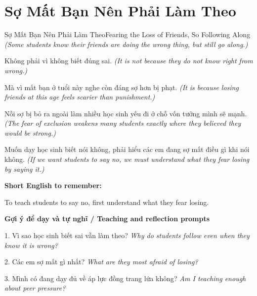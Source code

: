 \section{Sợ Mất Bạn Nên Phải Làm Theo}
\begin{truyen}{Sợ Mất Bạn Nên Phải Làm Theo}{Fearing the Loss of Friends, So Following Along}
\textit{(Some students know their friends are doing the wrong thing, but still go along.)}

Không phải vì không biết đúng sai.
\textit{(It is not because they do not know right from wrong.)}

Mà vì mất bạn ở tuổi này nghe còn đáng sợ hơn bị phạt.
\textit{(It is because losing friends at this age feels scarier than punishment.)}

Nỗi sợ bị bỏ ra ngoài làm nhiều học sinh yếu đi ở chỗ vốn tưởng mình sẽ mạnh.
\textit{(The fear of exclusion weakens many students exactly where they believed they would be strong.)}

\end{truyen}

\begin{baihoc}
Muốn dạy học sinh biết nói không, phải hiểu các em đang sợ mất điều gì khi nói không.
\textit{(If we want students to say no, we must understand what they fear losing by saying it.)}
\end{baihoc}

\begin{ghinhoanh}
\textbf{Short English to remember:}

To teach students to say no, first understand what they fear losing.

\end{ghinhoanh}

\begin{tuhocnhanh}
\textbf{Gợi ý để dạy và tự nghĩ / Teaching and reflection prompts}

1. Vì sao học sinh biết sai vẫn làm theo? \textit{Why do students follow even when they know it is wrong?}

2. Các em sợ mất gì nhất? \textit{What are they most afraid of losing?}

3. Mình có đang dạy đủ về áp lực đồng trang lứa không? \textit{Am I teaching enough about peer pressure?}
\end{tuhocnhanh}
\ngancach


